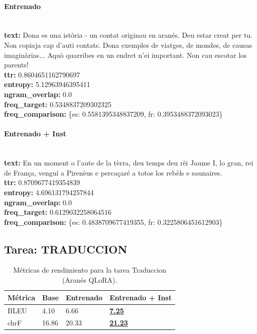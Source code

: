 \paragraph{Entrenado}~\\
\textbf{text:} Dona es una istòria - un contat originau en aranés. Deu estar creat per tu. Non copiaja cap\textquotesingle{} d’auti contats. Dona exemples de viatges, de mondes, de causas imaginàrias... Aquò qu\textquotesingle{}arribes en un endret n’ei important. Non cau escotar los parents!\\
\textbf{ttr:} 0.8604651162790697\\
\textbf{entropy:} 5.12963946395411\\
\textbf{ngram\_overlap:} 0.0\\
\textbf{freq\_target:} 0.5348837209302325\\
\textbf{freq\_comparison:} \{\textquotesingle{}es\textquotesingle{}: 0.5581395348837209, \textquotesingle{}fr\textquotesingle{}: 0.3953488372093023\}

\paragraph{Entrenado + Inst}~\\
\textbf{text:} En un moment o l’aute de la tèrra, deu temps deu rèi Jaume I, lo gran, rei de França, venguí a Pirenèus e percaçaré a totos los rebèls e saunaires.\\
\textbf{ttr:} 0.8709677419354839\\
\textbf{entropy:} 4.696131794257844\\
\textbf{ngram\_overlap:} 0.0\\
\textbf{freq\_target:} 0.6129032258064516\\
\textbf{freq\_comparison:} \{\textquotesingle{}es\textquotesingle{}: 0.4838709677419355, \textquotesingle{}fr\textquotesingle{}: 0.3225806451612903\}

\subsection{Tarea: TRADUCCION}\label{tarea-traduccion}
\begin{longtable}[]{@{}llll@{}}
\toprule\noalign{}
Métrica & Base & Entrenado & Entrenado + Inst \\
\midrule\noalign{}
\endhead
\bottomrule\noalign{}
\caption{Métricas de rendimiento para la tarea Traduccion (Aranés QLoRA).}
\label{tab:metricas_traduccion_Aranés QLoRA}
\endlastfoot
BLEU & 4.10 & 6.66 & \textbf{\underline{7.25}} \\
chrF & 16.86 & 20.33 & \textbf{\underline{21.23}} \\
\end{longtable}

